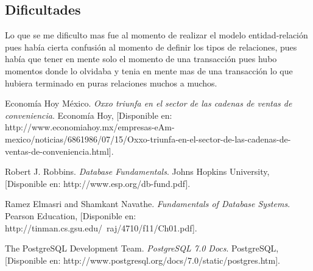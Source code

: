 \documentclass[spanish,12pt,letterpapper]{article}
\begin{document}
\subsection{Dificultades}
Lo que se me dificulto mas fue al momento de realizar el modelo entidad-relación pues había cierta confusión al momento de definir los tipos de relaciones, pues había que tener en mente solo el momento de una transacción pues hubo momentos donde lo olvidaba y tenia en mente mas de una transacción lo que hubiera terminado en puras relaciones muchos a muchos.
	
	\pagebreak
	\begin{thebibliography}{9}
	 Economía Hoy México. 
		\emph{Oxxo triunfa en el sector de las cadenas de ventas de conveniencia}. Economía Hoy, [Disponible en: http://www.economiahoy.mx/empresas-eAm-mexico/noticias/6861986/07/15/Oxxo-triunfa-en-el-sector-de-las-cadenas-de-ventas-de-conveniencia.html].
		
		 Robert J. Robbins. 
		\emph{Database Fundamentals}. Johns Hopkins University, [Disponible en: http://www.esp.org/db-fund.pdf].
		
		 Ramez Elmasri and Shamkant Navathe. 
		\emph{Fundamentals of Database Systems}. Pearson Education, [Disponible en: http://tinman.cs.gsu.edu/~raj/4710/f11/Ch01.pdf].
		
		 The PostgreSQL Development Team. 
		\emph{PostgreSQL 7.0 Docs}. PostgreSQL, [Disponible en: http://www.postgresql.org/docs/7.0/static/postgres.htm].
		

	\end{thebibliography}
\end{document}
